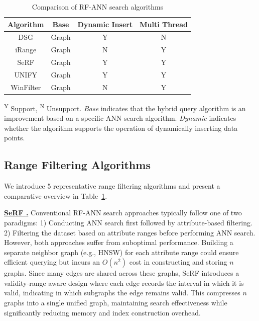 \documentclass[sigconf, nonacm]{acmart}
\begin{document}
	
	\setlength{\textfloatsep}{0.1cm}
	\setlength{\floatsep}{0cm}
	\begin{table}[t]
		\centering
		\setlength{\abovecaptionskip}{0.1cm}
		\setlength{\belowcaptionskip}{-0.1cm}
		\setlength{\textfloatsep}{0.1cm}
		\caption{Comparison of RF-ANN search algorithms}
		\small	%
		\label{tab:range_algo}
		\begin{tabular}{|c|c|c|c|}
			\hline
			\textbf{Algorithm} & \textbf{Base} & \textbf{Dynamic Insert} & \textbf{Multi Thread} \\
			\hline
			DSG & Graph & Y & N \\
			iRange & Graph & N & Y \\
			SeRF & Graph & Y & Y \\
			UNIFY & Graph & Y & Y \\
			WinFilter & Graph & N & Y  \\
			\hline
		\end{tabular}
		
		
		\footnotesize{
			\begin{minipage}{\linewidth}
				\textsuperscript{Y} Support, 
				\textsuperscript{N} Unsupport.
				\textit{Base} indicates that the hybrid query algorithm is an improvement based on a specific ANN search algorithm. 
				\textit{Dynamic} indicates whether the algorithm supports the operation of dynamically inserting data points.
			\end{minipage} 
		}
		
	\end{table}
	
	\subsection{Range Filtering Algorithms}
	
	We introduce 5 representative range filtering algorithms and present a comparative overview in Table~\ref{tab:range_algo}.
	
	
	\noindent\textbf{\underline{SeRF \cite{serf}.}}  
	Conventional RF-ANN search approaches typically follow one of two paradigms: 1) Conducting ANN search first followed by attribute-based filtering. 2) Filtering the dataset based on attribute ranges before performing ANN search. However, both approaches suffer from suboptimal performance. Building a separate neighbor graph (e.g., HNSW) for each attribute range could ensure efficient querying but incurs an $O(n^2)$ cost in constructing and storing $n$ graphs. Since many edges are shared across these graphs, SeRF introduces a validity-range aware design where each edge records the interval in which it is valid, indicating in which subgraphs the edge remains valid. This compresses $n$ graphs into a single unified graph, maintaining search effectiveness while significantly reducing memory and index construction overhead.
	
\end{document}
